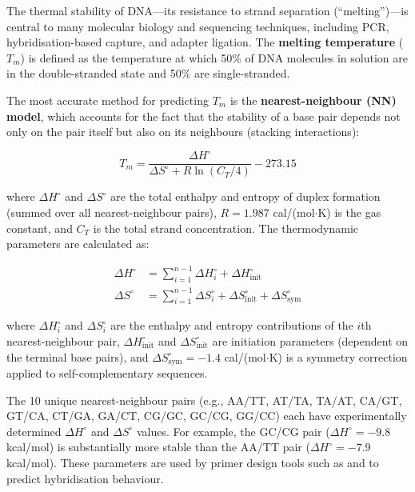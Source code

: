 The thermal stability of DNA---its resistance to strand separation (``melting'')---is central to many molecular biology and sequencing techniques, including \acrshort{PCR}, hybridisation-based capture, and adapter ligation. The \textbf{melting temperature} ($T_m$) is defined as the temperature at which 50\% of DNA molecules in solution are in the double-stranded state and 50\% are single-stranded.

The most accurate method for predicting $T_m$ is the \textbf{nearest-neighbour (NN) model}, which accounts for the fact that the stability of a base pair depends not only on the pair itself but also on its neighbours (stacking interactions):

\begin{equation}
T_m = \frac{\Delta H^\circ}{\Delta S^\circ + R \ln(C_T/4)} - 273.15
\label{eq:molbio:tm-nn}
\end{equation}

where $\Delta H^\circ$ and $\Delta S^\circ$ are the total enthalpy and entropy of duplex formation (summed over all nearest-neighbour pairs), $R = 1.987$ cal/(mol$\cdot$K) is the gas constant, and $C_T$ is the total strand concentration. The thermodynamic parameters are calculated as:

\begin{align}
\Delta H^\circ &= \sum_{i=1}^{n-1} \Delta H^\circ_i + \Delta H^\circ_{\text{init}} \label{eq:molbio:dh-nn} \\
\Delta S^\circ &= \sum_{i=1}^{n-1} \Delta S^\circ_i + \Delta S^\circ_{\text{init}} + \Delta S^\circ_{\text{sym}} \label{eq:molbio:ds-nn}
\end{align}

where $\Delta H^\circ_i$ and $\Delta S^\circ_i$ are the enthalpy and entropy contributions of the $i$th nearest-neighbour pair, $\Delta H^\circ_{\text{init}}$ and $\Delta S^\circ_{\text{init}}$ are initiation parameters (dependent on the terminal base pairs), and $\Delta S^\circ_{\text{sym}} = -1.4$ cal/(mol$\cdot$K) is a symmetry correction applied to self-complementary sequences.

\begin{keyconcept}[title={Nearest-Neighbour Parameters}]
The 10 unique nearest-neighbour pairs (e.g., AA/TT, AT/TA, TA/AT, CA/GT, GT/CA, CT/GA, GA/CT, CG/GC, GC/CG, GG/CC) each have experimentally determined $\Delta H^\circ$ and $\Delta S^\circ$ values. For example, the GC/CG pair ($\Delta H^\circ = -9.8$ kcal/mol) is substantially more stable than the AA/TT pair ($\Delta H^\circ = -7.9$ kcal/mol). These parameters are used by primer design tools such as  and  to predict hybridisation behaviour.
\end{keyconcept}

